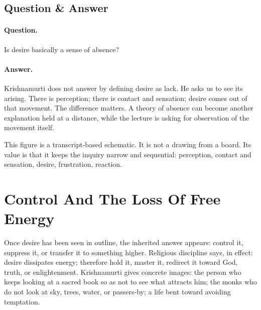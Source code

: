 \subsection{Question \& Answer}

\paragraph{Question.}
Is desire basically a sense of absence?

\paragraph{Answer.}
Krishnamurti does not answer by defining desire as lack. He asks us to see its arising. There is perception; there is contact and sensation; desire comes out of that movement. The difference matters. A theory of absence can become another explanation held at a distance, while the lecture is asking for observation of the movement itself.

\begin{figure}
\centering
{}
\end{figure}

This figure is a transcript-based schematic. It is not a drawing from a board. Its value is that it keeps the inquiry narrow and sequential: perception, contact and sensation, desire, frustration, reaction.

\section{Control And The Loss Of Free Energy}

Once desire has been seen in outline, the inherited answer appears: control it, suppress it, or transfer it to something higher. Religious discipline says, in effect: desire dissipates energy; therefore hold it, master it, redirect it toward God, truth, or enlightenment. Krishnamurti gives concrete images: the person who keeps looking at a sacred book so as not to see what attracts him; the monks who do not look at sky, trees, water, or passers-by; a life bent toward avoiding temptation.

